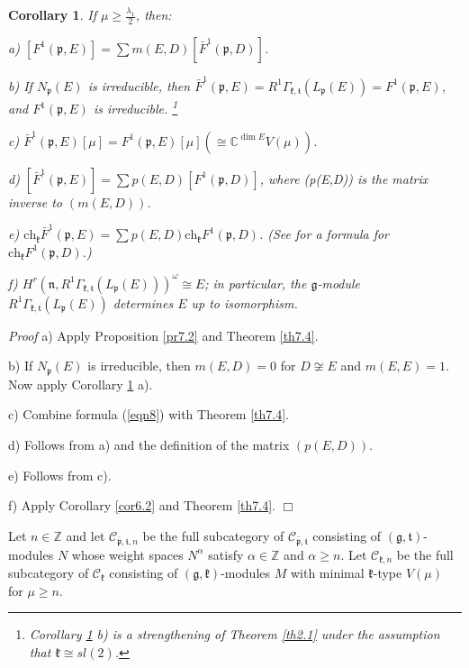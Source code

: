 \documentclass[11pt]{amsart}
\newcounter{theorem}
\newtheorem{corollary}[theo]{Corollary}
\renewenvironment{proof}{ \emph{Proof}}{$\Box$}
\renewcommand{\tt}{\mathfrak{t}}
\newcommand{\kk}{\mathfrak{k}}
\newcommand{\nn}{\mathfrak{n}}
\newcommand{\pp}{\mathfrak{p}}
\renewcommand{\gg}{\mathfrak{g}}
\newcommand{\refth}[1]{Theorem \ref{#1}}
\newcommand{\refcor}[1]{Corollary \ref{#1}}
\newcommand{\refprop}[1]{Proposition \ref{#1}}
\newcommand{\refeq}[1]{(\ref{#1})}
\newcommand{\ch}{\mathrm{ch}}
\newcommand{\field}[1]{\mathbb{#1}}
\begin{document}
\begin{corollary}\label{cor7.5}
If $\mu \geq \frac{\lambda_1}{2}$, then:

a) $[F^1(\pp,E)] = \sum m(E,D)[\bar{F}^1(\pp,D)]$.

b) If $N_\pp(E)$ is irreducible, then $\bar{F}^1(\pp,E)=R^1\Gamma_{\kk,\tt}(L_\pp(E))=F^1(\pp,E)$, and $F^1(\pp,E)$ is irreducible. \footnote{\refcor{cor7.5} b) is a strengthening of \refth{th2.1} under the assumption that $\kk\cong sl(2)$.}

c) $\bar{F}^1(\pp,E)[\mu] = F^1(\pp,E)[\mu](\cong \field{C}^{\dim E}V(\mu))$.

d) $[\bar{F}^1(\pp,E)] = \sum p(E,D)[F^1(\pp,D)]$, where (p(E,D)) is the matrix inverse to $(m(E,D))$.

e) $\ch_{\kk} \bar{F}^1(\pp,E) = \sum p(E,D) \ch_{\kk} F^1(\pp,D)$. (See \cite{PZ1} for a formula for $\ch_\kk F^1(\pp,D)$.)

f) $H^r(\nn,R^1\Gamma_{\kk,\tt}(L_\pp(E)))^{\omega}\cong E$; in particular, the $\gg$-module $R^1\Gamma_{\kk,\tt}(L_\pp(E))$ determines $E$ up to isomorphism.
\end{corollary}
\begin{proof}
a) Apply \refprop{pr7.2} and \refth{th7.4}.

b) If $N_\pp(E)$ is irreducible, then $m(E,D)=0$ for $D\not\cong E$ and $m(E,E)=1$. Now apply \refcor{cor7.5} a).

c) Combine formula \refeq{eqn8} with \refth{th7.4}.

d) Follows from a) and the definition of the matrix $(p(E,D))$.

e) Follows from c).

f) Apply \refcor{cor6.2} and \refth{th7.4}.
\end{proof}

Let $n\in\field{Z}$ and let $\mathcal{C}_{\bar{\pp},\tt,n}$ be the full subcategory of $\mathcal{C}_{\bar{\pp},\tt}$ consisting of $(\gg,\tt)$-modules $N$ whose weight spaces $N^\alpha$ satisfy $\alpha\in\field{Z}$ and $\alpha\geq n$. Let $\mathcal{C}_{\kk,n}$ be the full subcategory of $\mathcal{C}_{\kk}$ consisting of $(\gg,\kk)$-modules $M$ with minimal $\kk$-type $V(\mu)$ for $\mu\geq n$.
\end{document}
